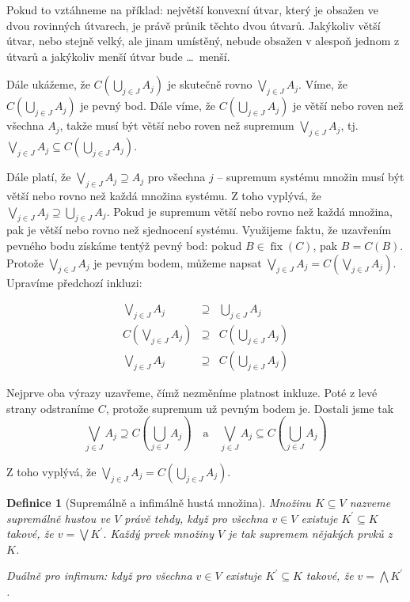 \documentclass[12pt]{article}
\DeclareMathOperator{\fix}{fix}
\newcommand{\biginf}{\bigwedge}
\newcommand{\bigsup}{\bigvee}
\newtheorem{mydef}{Definice}
\begin{document}
Pokud to vztáhneme na příklad: největší konvexní útvar, který je obsažen ve dvou rovinných útvarech, je právě průnik těchto dvou útvarů. Jakýkoliv větší útvar, nebo stejně velký, ale jinam umístěný, nebude obsažen v alespoň jednom z útvarů a jakýkoliv menší útvar bude \dots\, menší. 

Dále ukážeme, že $C(\bigcup_{j\in J}A_j)$ je skutečně rovno $\bigsup_{j\in J}A_j$. Víme, že $C(\bigcup_{j\in J}A_j)$ je pevný bod. Dále víme, že $C(\bigcup_{j\in J}A_j)$ je větší nebo roven než všechna $A_j$, takže musí být větší nebo roven než supremum $\bigsup_{j\in J}A_j$, tj. $\bigsup_{j\in J}A_j\subseteq C(\bigcup_{j\in J}A_j)$. 

Dále platí, že $\bigsup_{j\in J}A_j\supseteq A_j$ pro všechna $j$ -- supremum systému množin musí být větší nebo rovno než každá množina systému. Z toho vyplývá, že $\bigsup_{j\in J}A_j\supseteq\bigcup_{j\in J}A_j$. Pokud je supremum větší nebo rovno než každá množina, pak je větší nebo rovno než sjednocení systému. Využijeme faktu, že uzavřením pevného bodu získáme tentýž pevný bod: pokud $B\in\fix(C)$, pak $B=C(B)$. Protože $\bigsup_{j\in J}A_j$ je pevným bodem, můžeme napsat $\bigsup_{j\in J}A_j=C(\bigsup_{j\in J}A_j)$. Upravíme předchozí inkluzi: 

\begin{eqnarray}
\bigsup_{j\in J}A_j&\supseteq&\bigcup_{j\in J}A_j\\
C(\bigsup_{j\in J}A_j)&\supseteq&C(\bigcup_{j\in J}A_j)\\
\bigsup_{j\in J}A_j&\supseteq&C(\bigcup_{j\in J}A_j)
\end{eqnarray}

Nejprve oba výrazy uzavřeme, čímž nezměníme platnost inkluze. Poté z levé strany odstraníme $C$, protože supremum už pevným bodem je. Dostali jsme tak
$$
\bigsup_{j\in J}A_j\supseteq C(\bigcup_{j\in J}A_j)\quad\mbox{a}\quad\bigsup_{j\in J}A_j\subseteq C(\bigcup_{j\in J}A_j)
$$

Z toho vyplývá, že $\bigsup_{j\in J}A_j=C(\bigcup_{j\in J}A_j)$.

\begin{mydef}[Supremálně a infimálně hustá množina]
Množinu $K\subseteq V$ nazveme supremálně hustou ve $V$ právě tehdy, když pro všechna $v \in V$ existuje $K^\prime\subseteq K$ takové, že $v=\bigsup K^\prime$. Každý prvek množiny $V$ je tak supremem nějakých prvků z $K$.

Duálně pro infimum: když pro všechna $v \in V$ existuje $K^\prime\subseteq K$ takové, že $v=\biginf K^\prime$.
\end{mydef}
\end{document}
